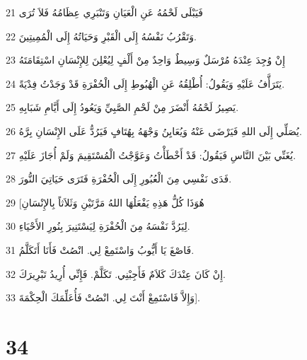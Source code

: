 \par 21 فَيَبْلَى لَحْمُهُ عَنِ الْعَيَانِ وَتَنْبَرِي عِظَامُهُ فَلاَ تُرَى
\par 22 وَتَقْرُبُ نَفْسُهُ إِلَى الْقَبْرِ وَحَيَاتُهُ إِلَى الْمُمِيتِينَ.
\par 23 إِنْ وُجِدَ عِنْدَهُ مُرْسَلٌ وَسِيطٌ وَاحِدٌ مِنْ أَلْفٍ لِيُعْلِنَ لِلإِنْسَانِ اسْتِقَامَتَهُ
\par 24 يَتَرَأَّفُ عَلَيْهِ وَيَقُولُ: أُطْلِقُهُ عَنِ الْهُبُوطِ إِلَى الْحُفْرَةِ قَدْ وَجَدْتُ فِدْيَةً.
\par 25 يَصِيرُ لَحْمُهُ أَنْضَرَ مِنْ لَحْمِ الصَّبِيِّ وَيَعُودُ إِلَى أَيَّامِ شَبَابِهِ.
\par 26 يُصَلِّي إِلَى اللهِ فَيَرْضَى عَنْهُ وَيُعَايِنُ وَجْهَهُ بِهُتَافٍ فَيَرُدُّ عَلَى الإِنْسَانِ بِرَّهُ.
\par 27 يُغَنِّي بَيْنَ النَّاسِ فَيَقُولُ: قَدْ أَخْطَأْتُ وَعَوَّجْتُ الْمُسْتَقِيمَ وَلَمْ أُجَازَ عَلَيْهِ.
\par 28 فَدَى نَفْسِي مِنَ الْعُبُورِ إِلَى الْحُفْرَةِ فَتَرَى حَيَاتِيَ النُّورَ.
\par 29 [هُوَذَا كُلُّ هَذِهِ يَفْعَلُهَا اللهُ مَرَّتَيْنِ وَثَلاَثاً بِالإِنْسَانِ
\par 30 لِيَرُدَّ نَفْسَهُ مِنَ الْحُفْرَةِ لِيَسْتَنِيرَ بِنُورِ الأَحْيَاءِ.
\par 31 فَاصْغَ يَا أَيُّوبُ وَاسْتَمِعْ لِي. انْصُتْ فَأَنَا أَتَكَلَّمُ.
\par 32 إِنْ كَانَ عِنْدَكَ كَلاَمٌ فَأَجِبْنِي. تَكَلَّمْ. فَإِنِّي أُرِيدُ تَبْرِيرَكَ.
\par 33 وَإِلاَّ فَاسْتَمِعْ أَنْتَ لِي. انْصُتْ فَأُعَلِّمَكَ الْحِكْمَةَ].

\chapter{34}

